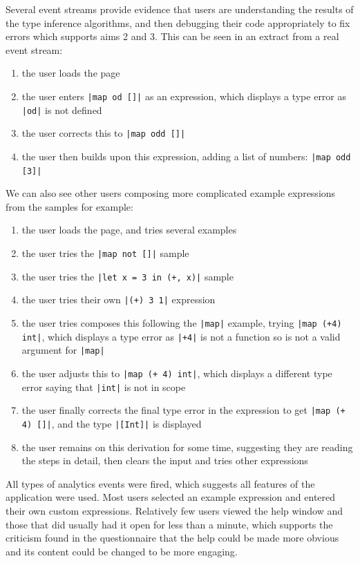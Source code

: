 \documentclass[a4paper,fleqn,twoside,12pt]{report}
\begin{document}
Several event streams provide evidence that users are understanding the results of the type inference algorithms, and then debugging their code appropriately to fix errors which supports aims 2 and 3. This can be seen in an extract from a real event stream:
\begin{enumerate}
  \item the user loads the page
  \item the user enters \texttt{|map od []|} as an expression, which displays a type error as \texttt{|od|} is not defined
  \item the user corrects this to \texttt{|map odd []|}
  \item the user then builds upon this expression, adding a list of numbers: \texttt{|map odd [3]|}
\end{enumerate}

We can also see other users composing more complicated example expressions from the samples for example:
\begin{enumerate}
  \item the user loads the page, and tries several examples
  \item the user tries the \texttt{|map not []|} sample
  \item the user tries the \texttt{|let x = 3 in (+, x)|} sample
  \item the user tries their own \texttt{|(+) 3 1|} expression
  \item the user tries composes this following the \texttt{|map|} example, trying \texttt{|map (+4) int|}, which displays a type error as \texttt{|+4|} is not a function so is not a valid argument for \texttt{|map|}
  \item the user adjusts this to \texttt{|map (+ 4) int|}, which displays a different type error saying that \texttt{|int|} is not in scope
  \item the user finally corrects the final type error in the expression to get \texttt{|map (+ 4) []|}, and the type \texttt{|[Int]|} is displayed
  \item the user remains on this derivation for some time, suggesting they are reading the steps in detail, then clears the input and tries other expressions
\end{enumerate}

All types of analytics events were fired, which suggests all features of the application were used. Most users selected an example expression and entered their own custom expressions. Relatively few users viewed the help window and those that did usually had it open for less than a minute, which supports the criticism found in the questionnaire that the help could be made more obvious and its content could be changed to be more engaging.
\end{document}
